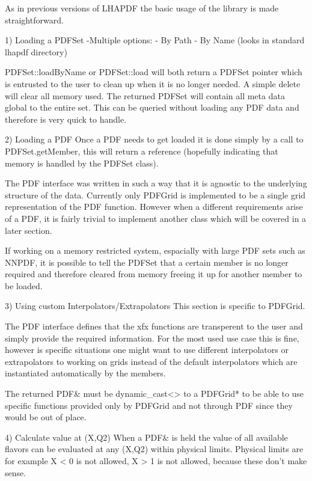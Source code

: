 As in previous versions of LHAPDF the basic usage of the library is made 
straightforward.

1) Loading a PDFSet
-Multiple options:
	- By Path
	- By Name (looks in standard lhapdf directory)

PDFSet::loadByName or PDFSet::load will both return a PDFSet pointer which is 
entrusted to the user to clean up when it is no longer needed. A simple delete 
will clear all memory used. The returned PDFSet will contain all meta data 
global to the entire set. This can be queried without loading any PDF data and 
therefore is very quick to handle.

2) Loading a PDF
Once a PDF needs to get loaded it is done simply by a call to PDFSet.getMember, 
this will return a reference (hopefully indicating that memory is handled by 
the PDFSet class).

The PDF interface was written in such a way that it is agnostic to the 
underlying structure of the data. Currently only PDFGrid is implemented to be a 
single grid representation of the PDF function. However when a different 
requirements arise of a PDF, it is fairly trivial to implement another class 
which will be covered in a later section.

If working on a memory restricted system, espacially with large PDF sets such as 
NNPDF, it is possible to tell the PDFSet that a certain member is no longer 
required and therefore cleared from memory freeing it up for another member to 
be loaded.

3) Using custom Interpolators/Extrapolators
This section is specific to PDFGrid.

The PDF interface defines that the xfx functions are transperent to the user and 
simply provide the required information. For the most used use case this is 
fine, however is specific situations one might want to use different 
interpolators or extrapolators to working on grids instead of the default 
interpolators which are instantiated automatically by the members.

The returned PDF& must be dynamic_cast<> to a PDFGrid* to be able to use 
specific functions provided only by PDFGrid and not through PDF since they would 
be out of place.

4) Calculate value at (X,Q2)
When a PDF& is held the value of all available flavors can be evaluated 
at any (X,Q2) within physical limits. Physical limits are for example X 
< 0 is not allowed, X > 1 is not allowed, because these don't make 
sense.
